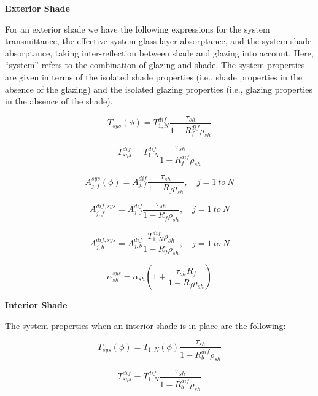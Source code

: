 \textbf{Exterior Shade}

For an exterior shade we have the following expressions for the system transmittance, the effective system glass layer absorptance, and the system shade absorptance, taking inter-reflection between shade and glazing into account. Here, ``system'' refers to the combination of glazing and shade. The system properties are given in terms of the isolated shade properties (i.e., shade properties in the absence of the glazing) and the isolated glazing properties (i.e., glazing properties in the absence of the shade).

\begin{equation}
{T_{sys}}(\phi ) = T_{1,N}^{dif}\frac{{{\tau_{sh}}}}{{1 - R_f^{dif}{\rho_{sh}}}}
\end{equation}

\begin{equation}
T_{sys}^{dif} = T_{1,N}^{dif}\frac{{{\tau_{sh}}}}{{1 - R_f^{dif}{\rho_{sh}}}}
\end{equation}

\begin{equation}
A_{j,f}^{sys}(\phi ) = A_{j,f}^{dif}\frac{{{\tau_{sh}}}}{{1 - {R_f}{\rho_{sh}}}},\quad j = 1~to~N
\end{equation}

\begin{equation}
A_{j,f}^{dif,sys} = A_{j,f}^{dif}\frac{{{\tau_{sh}}}}{{1 - {R_f}{\rho_{sh}}}},\quad j = 1~to~N
\end{equation}

\begin{equation}
A_{j,b}^{dif,sys} = A_{j,b}^{dif}\frac{{T_{1,N}^{dif}{\rho_{sh}}}}{{1 - {R_f}{\rho_{sh}}}},\quad j = 1~to~N
\end{equation}

\begin{equation}
\alpha_{sh}^{sys} = {\alpha_{sh}}\left( {1 + \frac{{{\tau_{sh}}{R_f}}}{{1 - {R_f}{\rho_{sh}}}}} \right)
\end{equation}

\textbf{Interior Shade}

The system properties when an interior shade is in place are the following:

\begin{equation}
{T_{sys}}(\phi ) = T_{1,N}^{}(\phi )\frac{{{\tau_{sh}}}}{{1 - R_b^{dif}{\rho_{sh}}}}
\end{equation}

\begin{equation}
T_{sys}^{dif} = T_{1,N}^{dif}\frac{{{\tau_{sh}}}}{{1 - R_b^{dif}{\rho_{sh}}}}
\end{equation}

